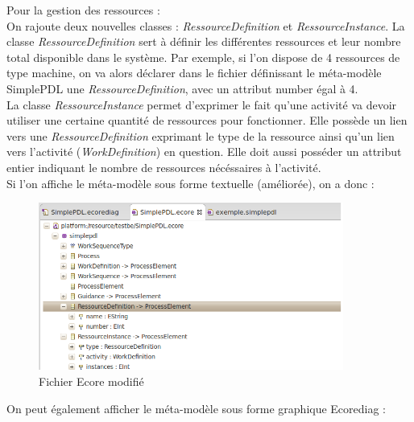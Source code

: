 \documentclass{report}
\begin{document}
Pour la gestion des ressources :\\

On rajoute deux nouvelles classes : \textit{RessourceDefinition} et \textit{RessourceInstance}.
La classe \textit{RessourceDefinition} sert à définir les différentes ressources et leur nombre total disponible dans le système. Par exemple, si l'on dispose de 4 ressources de type machine,
on va alors déclarer dans le fichier définissant le méta-modèle SimplePDL une \textit{RessourceDefinition}, avec un attribut number égal à 4.\\

La classe \textit{RessourceInstance} permet d'exprimer le fait qu'une activité va devoir utiliser une certaine quantité de ressources pour fonctionner.
Elle possède un lien vers une \textit{RessourceDefinition} exprimant le type de la ressource ainsi qu'un lien vers l'activité (\textit{WorkDefinition}) en question.
Elle doit aussi posséder un attribut entier indiquant le nombre de ressources nécéssaires à l'activité.\\

Si l'on affiche le méta-modèle sous forme textuelle (améliorée), on a donc :\\

\begin{figure}[!h] 
\begin{center}
\includegraphics[width=10cm]{Capture-2.png}
\caption{Fichier Ecore modifié} 
\label{img1} 
\end{center}
\end{figure} 

On peut également afficher le méta-modèle sous forme graphique Ecorediag :\\
\end{document}
